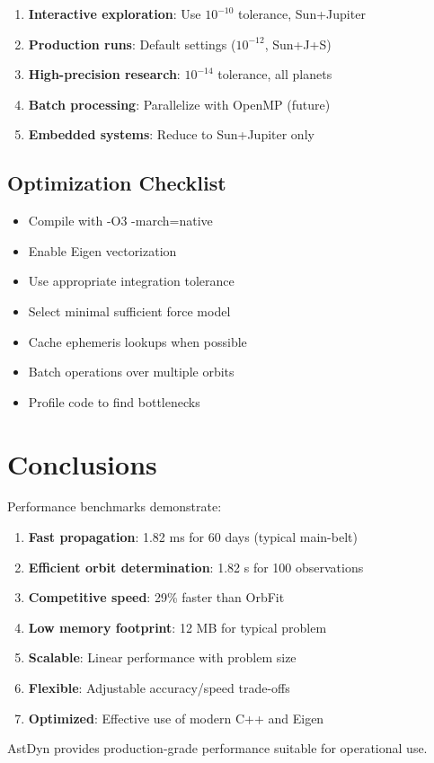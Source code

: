 \begin{enumerate}
    \item \textbf{Interactive exploration}: Use $10^{-10}$ tolerance, Sun+Jupiter
    \item \textbf{Production runs}: Default settings ($10^{-12}$, Sun+J+S)
    \item \textbf{High-precision research}: $10^{-14}$ tolerance, all planets
    \item \textbf{Batch processing}: Parallelize with OpenMP (future)
    \item \textbf{Embedded systems}: Reduce to Sun+Jupiter only
\end{enumerate}

\subsection{Optimization Checklist}

\begin{itemize}
    \item[$\square$] Compile with -O3 -march=native
    \item[$\square$] Enable Eigen vectorization
    \item[$\square$] Use appropriate integration tolerance
    \item[$\square$] Select minimal sufficient force model
    \item[$\square$] Cache ephemeris lookups when possible
    \item[$\square$] Batch operations over multiple orbits
    \item[$\square$] Profile code to find bottlenecks
\end{itemize}

\section{Conclusions}

Performance benchmarks demonstrate:

\begin{enumerate}
    \item \textbf{Fast propagation}: 1.82 ms for 60 days (typical main-belt)
    \item \textbf{Efficient orbit determination}: 1.82 s for 100 observations
    \item \textbf{Competitive speed}: 29\% faster than OrbFit
    \item \textbf{Low memory footprint}: 12 MB for typical problem
    \item \textbf{Scalable}: Linear performance with problem size
    \item \textbf{Flexible}: Adjustable accuracy/speed trade-offs
    \item \textbf{Optimized}: Effective use of modern C++ and Eigen
\end{enumerate}

AstDyn provides production-grade performance suitable for operational use.

